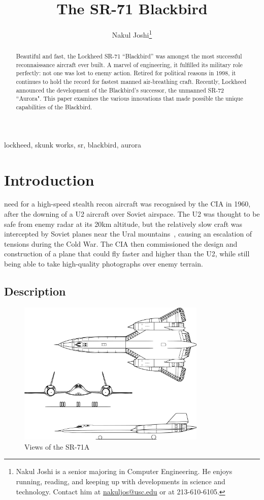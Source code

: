 \documentclass[12pt, draftclsnofoot, onecolumn]{IEEEtran}
\title{The SR-71 Blackbird}
\author{Nakul Joshi\thanks{
	Nakul Joshi is a senior majoring in Computer Engineering. He enjoys running, reading, and keeping up with developments in science and technology. Contact him at \href{mailto:nakuljos@usc.edu}{nakuljos@usc.edu} or at 213-610-6105.
}}
\begin{document}
\maketitle

\begin{abstract}
	Beautiful and fast, the Lockheed SR-71 ``Blackbird'' was amongst the most successful reconnaissance aircraft ever built. A marvel of engineering, it fulfilled its military role perfectly: not one was lost to enemy action. Retired for political reasons in 1998, it continues to hold the record for fastest manned air-breathing craft. Recently, Lockheed announced the development of the Blackbird's successor, the unmanned SR-72 ``Aurora". This paper examines the various innovations that made possible the unique capabilities of the Blackbird.
\end{abstract}

\begin{IEEEkeywords} lockheed, skunk works, sr, blackbird, aurora \end{IEEEkeywords}



\section{Introduction}

	 need for a high-speed stealth recon aircraft was recognised by the CIA in 1960, after the downing of a U2 aircraft over Soviet airspace. The U2 was thought to be safe from enemy radar at its 20km altitude, but the relatively slow craft was intercepted by Soviet planes near the Ural mountains~\cite{u2}, causing an escalation of tensions during the Cold War. The CIA then commissioned the design and construction of a plane that could fly faster and higher than the U2, while still being able to take high-quality photographs over enemy terrain.	
	
	\subsection{Description}

	\begin{figure}[h]
		\centering
		\includegraphics[width=0.8\textwidth]{view.pdf}
		\caption{Views of the SR-71A}
	\end{figure}
\end{document}
